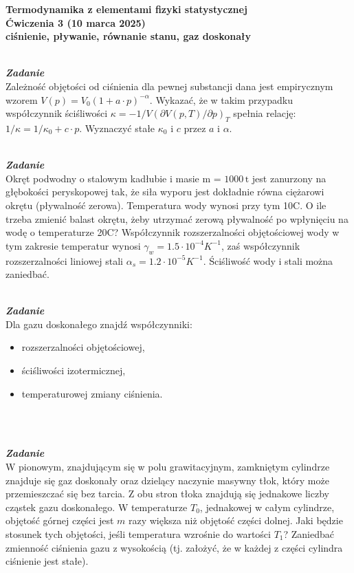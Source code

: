 \documentclass[11pt,a4paper]{article}
\newcounter{zadanie}\newcommand{\zadanie}[1][]{\addtocounter{zadanie}{1} ~\\  {\bf \emph{Zadanie \arabic{zadanie} #1 }} \\}
\begin{document}
\vspace*{-1.8cm}

\begin{centering}
\bf{\Large{Termodynamika z elementami fizyki statystycznej}}\\
Ćwiczenia 3 (10 marca 2025)\\[1mm]
ciśnienie, pływanie, równanie stanu, gaz doskonały \\
\end{centering}

\zadanie
Zależność objętości od ciśnienia dla pewnej substancji dana jest empirycznym wzorem $V(p) = V_0(1 + a\cdot p)^{-\alpha}$.
Wykazać, że w takim przypadku współczynnik ściśliwości $\kappa=-1/V(\partial V(p,T)/\partial p)_T$ spełnia relację: $1/\kappa=1/\kappa_0+c\cdot p$.
Wyznaczyć stałe $\kappa_0$ i $c$ przez $a$ i $\alpha$.

\zadanie
Okręt podwodny o stalowym kadłubie i masie m = $1000\,\textrm{t}$ jest zanurzony na głębokości peryskopowej tak, że siła wyporu jest dokładnie równa ciężarowi okrętu (pływalność zerowa). Temperatura wody wynosi przy tym 10\degree C. O ile trzeba zmienić balast okrętu, żeby utrzymać zerową pływalność po wpłynięciu na wodę o temperaturze 20\degree C? Współczynnik rozszerzalności objętościowej wody w tym zakresie temperatur wynosi $\gamma_w = 1.5 \cdot 10^{-4} K^{-1}$, zaś współczynnik rozszerzalności liniowej stali $\alpha_s = 1.2 \cdot 10^{-5} K^{-1}$. Ściśliwość wody i stali można zaniedbać.


\zadanie
Dla gazu doskonałego znajdź współczynniki:
\begin{itemize}
\item[1.] rozszerzalności objętościowej,
\item[2.] ściśliwości izotermicznej,
\item[3.] temperaturowej zmiany ciśnienia.
\end{itemize}
\phantom{.} \\
\zadanie
W pionowym, znajdującym się w polu grawitacyjnym, zamkniętym cylindrze znajduje się gaz doskonały oraz dzielący naczynie masywny tłok, który może przemieszczać się bez tarcia. Z obu stron tłoka znajdują się jednakowe liczby cząstek gazu doskonałego. W temperaturze $T_0$, jednakowej w całym cylindrze, objętość górnej części jest $m$ razy większa niż objętość części dolnej. Jaki będzie stosunek tych objętości, jeśli temperatura wzrośnie do wartości $T_1$? Zaniedbać zmienność ciśnienia gazu z wysokością (tj. założyć, że w każdej z części cylindra ciśnienie jest stałe).
\end{document}

